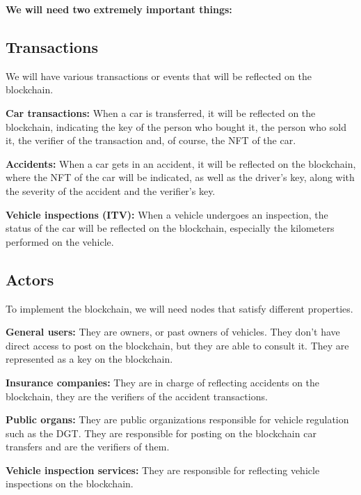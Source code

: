 \documentclass[twocolumn]{article} %
\begin{document}
\noindent \textbf{We will need two extremely important things:}

\subsection{Transactions}
We will have various transactions or events that will be reflected on the blockchain.\newline

\textbf{Car transactions:} When a car is transferred, it will be reflected on the blockchain, indicating the key of the person who bought it, the person who sold it, the verifier of the transaction and, of course, the NFT of the car.\newline

\textbf{Accidents:} When a car gets in an accident, it will be reflected on the blockchain, where the NFT of the car will be indicated, as well as the driver's key, along with the severity of the accident and the verifier's key.\newline

\textbf{Vehicle inspections (ITV):} When a vehicle undergoes an inspection, the status of the car will be reflected on the blockchain, especially the kilometers performed on the vehicle. \newline  





\subsection{Actors}
To implement the blockchain, we will need nodes that satisfy different properties.

\textbf{General users:} They are owners, or past owners of vehicles. They don't have direct access to post on the blockchain, but they are able to consult it. They are represented as a key on the blockchain. \newline


\textbf{Insurance companies:} They are in charge of reflecting accidents on the blockchain, they are the verifiers of the accident transactions.\newline

\textbf{Public organs:} They are public organizations responsible for vehicle regulation such as the DGT. They are responsible for posting on the blockchain car transfers and are the verifiers of them.\newline

\textbf{Vehicle inspection services:} They are responsible for reflecting vehicle inspections on the blockchain.\newline
\end{document}
